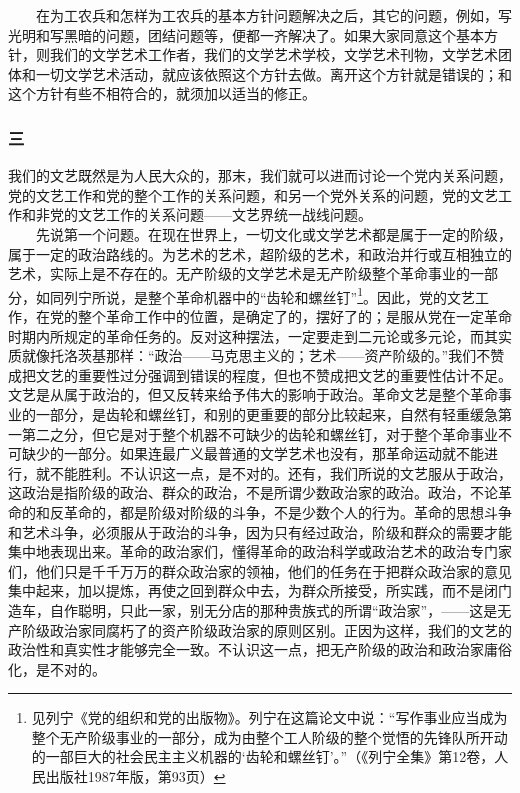 \documentclass[cn,11pt,chinese]{elegantbook}
\def\myformat#1{\hfil\hfil #1}
\begin{document}
　　在为工农兵和怎样为工农兵的基本方针问题解决之后，其它的问题，例如，写光明和写黑暗的问题，团结问题等，便都一齐解决了。如果大家同意这个基本方针，则我们的文学艺术工作者，我们的文学艺术学校，文学艺术刊物，文学艺术团体和一切文学艺术活动，就应该依照这个方针去做。离开这个方针就是错误的；和这个方针有些不相符合的，就须加以适当的修正。\\
\subsubsection*{\myformat{三}}
我们的文艺既然是为人民大众的，那末，我们就可以进而讨论一个党内关系问题，党的文艺工作和党的整个工作的关系问题，和另一个党外关系的问题，党的文艺工作和非党的文艺工作的关系问题——文艺界统一战线问题。\\
　　先说第一个问题。在现在世界上，一切文化或文学艺术都是属于一定的阶级，属于一定的政治路线的。为艺术的艺术，超阶级的艺术，和政治并行或互相独立的艺术，实际上是不存在的。无产阶级的文学艺术是无产阶级整个革命事业的一部分，如同列宁所说，是整个革命机器中的“齿轮和螺丝钉”\footnote[10]{ 见列宁《党的组织和党的出版物》。列宁在这篇论文中说：“写作事业应当成为整个无产阶级事业的一部分，成为由整个工人阶级的整个觉悟的先锋队所开动的一部巨大的社会民主主义机器的‘齿轮和螺丝钉’。”（《列宁全集》第12卷，人民出版社1987年版，第93页）}。因此，党的文艺工作，在党的整个革命工作中的位置，是确定了的，摆好了的；是服从党在一定革命时期内所规定的革命任务的。反对这种摆法，一定要走到二元论或多元论，而其实质就像托洛茨基那样：“政治——马克思主义的；艺术——资产阶级的。”我们不赞成把文艺的重要性过分强调到错误的程度，但也不赞成把文艺的重要性估计不足。文艺是从属于政治的，但又反转来给予伟大的影响于政治。革命文艺是整个革命事业的一部分，是齿轮和螺丝钉，和别的更重要的部分比较起来，自然有轻重缓急第一第二之分，但它是对于整个机器不可缺少的齿轮和螺丝钉，对于整个革命事业不可缺少的一部分。如果连最广义最普通的文学艺术也没有，那革命运动就不能进行，就不能胜利。不认识这一点，是不对的。还有，我们所说的文艺服从于政治，这政治是指阶级的政治、群众的政治，不是所谓少数政治家的政治。政治，不论革命的和反革命的，都是阶级对阶级的斗争，不是少数个人的行为。革命的思想斗争和艺术斗争，必须服从于政治的斗争，因为只有经过政治，阶级和群众的需要才能集中地表现出来。革命的政治家们，懂得革命的政治科学或政治艺术的政治专门家们，他们只是千千万万的群众政治家的领袖，他们的任务在于把群众政治家的意见集中起来，加以提炼，再使之回到群众中去，为群众所接受，所实践，而不是闭门造车，自作聪明，只此一家，别无分店的那种贵族式的所谓“政治家”，——这是无产阶级政治家同腐朽了的资产阶级政治家的原则区别。正因为这样，我们的文艺的政治性和真实性才能够完全一致。不认识这一点，把无产阶级的政治和政治家庸俗化，是不对的。\\
\end{document}
